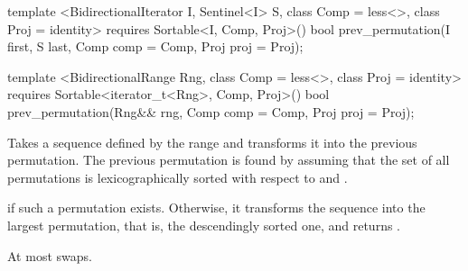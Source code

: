 %
\begin{itemdecl}
template <BidirectionalIterator I, Sentinel<I> S, class Comp = less<>,
    class Proj = identity>
  requires Sortable<I, Comp, Proj>()
  bool prev_permutation(I first, S last, Comp comp = Comp{}, Proj proj = Proj{});

template <BidirectionalRange Rng, class Comp = less<>,
    class Proj = identity>
  requires Sortable<iterator_t<Rng>, Comp, Proj>()
  bool
    prev_permutation(Rng&& rng, Comp comp = Comp{}, Proj proj = Proj{});
\end{itemdecl}

\begin{itemdescr}
\pnum
\effects
Takes a sequence defined by the range
and transforms it into the previous permutation.
The previous permutation is found by assuming that the set of all permutations is
lexicographically sorted with respect to
 and .

\pnum
\returns
{}
if such a permutation exists.
Otherwise, it transforms the sequence into the largest permutation,
that is, the descendingly sorted one, and returns
.

\pnum
\complexity
At most
swaps.
\end{itemdescr}
